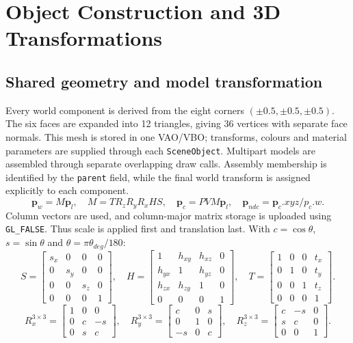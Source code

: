 \section{Object Construction and 3D Transformations}\subsection{Shared geometry and model transformation}
Every world component is derived from the eight corners $(\pm0.5,\pm0.5,\pm0.5)$. The six faces are expanded into 12 triangles, giving 36 vertices with separate face normals. This mesh is stored in one VAO/VBO; transforms, colours and material parameters are supplied through each \texttt{SceneObject}. Multipart models are assembled through separate overlapping draw calls. Assembly membership is identified by the \texttt{parent} field, while the final world transform is assigned explicitly to each component.
\begin{equation}
 \mathbf p_w=M\mathbf p_l,\quad M=T R_zR_yR_xHS,\quad
 \mathbf p_c=PVM\mathbf p_l,\quad \mathbf p_{ndc}=\mathbf p_c.xyz/p_c.w.
\end{equation}
Column vectors are used, and column-major matrix storage is uploaded using \texttt{GL\_FALSE}. Thus scale is applied first and translation last. With $c=\cos\theta$, $s=\sin\theta$ and $\theta=\pi\theta_{deg}/180$:
\[
 S=\begin{bmatrix}s_x&0&0&0\\0&s_y&0&0\\0&0&s_z&0\\0&0&0&1\end{bmatrix},\quad
 H=\begin{bmatrix}1&h_{xy}&h_{xz}&0\\h_{yx}&1&h_{yz}&0\\h_{zx}&h_{zy}&1&0\\0&0&0&1\end{bmatrix},\quad
 T=\begin{bmatrix}1&0&0&t_x\\0&1&0&t_y\\0&0&1&t_z\\0&0&0&1\end{bmatrix}.
\]
\[
 R_x^{3\times3}=\begin{bmatrix}1&0&0\\0&c&-s\\0&s&c\end{bmatrix},\quad
 R_y^{3\times3}=\begin{bmatrix}c&0&s\\0&1&0\\-s&0&c\end{bmatrix},\quad
 R_z^{3\times3}=\begin{bmatrix}c&-s&0\\s&c&0\\0&0&1\end{bmatrix}.
\]
